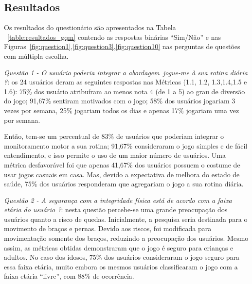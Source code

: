 \subsection{Resultados}
Os resultados do questionário são apresentados na Tabela ~\ref{table:resultados_gqm} contendo as respostas binárias ``Sim/Não'' e nas Figuras~\ref{fig:question1},\ref{fig:question3},\ref{fig:question10} nas perguntas de questões com múltipla escolha.

\textit{Questão 1 - O usuário poderia integrar a abordagem~\ac{jogue-me} à sua rotina diária ?}: os 24 usuários deram as seguintes respostas nas Métricas (1.1, 1.2, 1.3,1.4,1.5 e 1.6): 75\% dos usuário atribuíram ao menos nota 4 (de 1 a 5) ao grau de diversão do jogo; 91,67\% sentiram motivados com o jogo; 58\% dos usuários jogariam 3 vezes por semana, 25\% jogariam todos os dias e apenas 17\% jogariam uma vez por semana. 

Então, tem-se um percentual de 83\% de usuários que poderiam integrar o monitoramento motor a sua rotina; 91,67\% consideraram o jogo simples e de fácil entendimento, e isso permite o uso de um maior número de usuários. Uma métrica desfavorável foi que apenas 41,67\% dos usuários possuem o costume de usar jogos casuais em casa. Mas, devido a expectativa de melhora do estado de saúde, 75\% dos usuários responderam que agregariam o jogo a sua rotina diária.

\textit{Questão 2 - A segurança com a integridade física está de acordo com a faixa etária do usuário
?}: nesta questão percebe-se uma grande preocupação dos usuários quanto a risco de quedas. Inicialmente, a pesquisa seria destinada para o movimento de braços e pernas. Devido aos riscos, foi modificada para movimentação somente dos braços, reduzindo a preocupação dos usuários. Mesmo assim, as métricas obtidas demonstraram que o jogo é seguro para crianças e adultos. No caso dos idosos, 75\% dos usuários consideraram o jogo seguro para essa faixa etária, muito embora os mesmos usuários classificaram o jogo com a faixa etária ``livre'', com 88\% de ocorrência.

